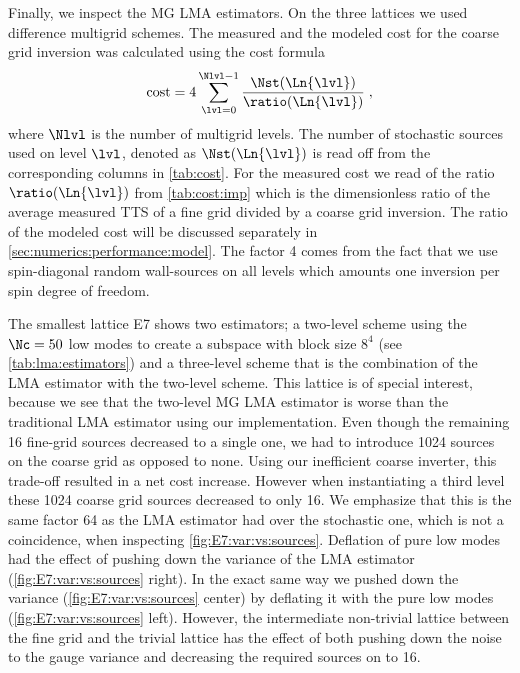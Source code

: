 Finally, we inspect the MG LMA estimators.
On the three lattices we used difference multigrid schemes.
The measured and the modeled cost for the coarse grid inversion was calculated using the cost formula
\begin{equation} \label{eq:numerics:cost}
\text{cost} = 4 \sum_{\lvl = 0}^{\Nlvl -1} \frac{\Nst(\Ln{\lvl})}{\ratio(\Ln{\lvl})} \;,
\end{equation}
where $\Nlvl$ is the number of multigrid levels.
The number of stochastic sources used on level $\lvl$, denoted as $\Nst(\Ln{\lvl})$ is read off from the corresponding columns in \cref{tab:cost}.
For the measured cost we read of the ratio $\ratio(\Ln{\lvl})$ from \cref{tab:cost:imp} which is the dimensionless ratio of the average measured TTS of a fine grid divided by a coarse grid inversion.
The ratio of the modeled cost will be discussed separately in \cref{sec:numerics:performance:model}.
The factor \num{4} comes from the fact that we use spin-diagonal random wall-sources on all levels which amounts one inversion per spin degree of freedom.

The smallest lattice E7 shows two estimators; a two-level scheme using the $\Nc=50$ low modes to create a subspace with block size $8^4$ (see \cref{tab:lma:estimators}) and a three-level scheme that is the combination of the LMA estimator with the two-level scheme.
This lattice is of special interest, because we see that the two-level MG LMA estimator is worse than the traditional LMA estimator using our implementation.
Even though the remaining \num{16} fine-grid sources decreased to a single one, we had to introduce \num{1024} sources on the coarse grid as opposed to none.
Using our inefficient coarse inverter, this trade-off resulted in a net cost increase.
However when instantiating a third level these \num{1024} coarse grid sources decreased to only \num{16}.
We emphasize that this is the same factor \num{64} as the LMA estimator had over the stochastic one, which is not a coincidence, when inspecting \cref{fig:E7:var:vs:sources}.
Deflation of pure low modes had the effect of pushing down the  variance of the LMA estimator (\cref{fig:E7:var:vs:sources} right).
In the exact same way we pushed down the  variance (\cref{fig:E7:var:vs:sources} center) by deflating it with the pure low modes (\cref{fig:E7:var:vs:sources} left).
However, the intermediate non-trivial lattice between the fine grid and the trivial lattice has the effect of both pushing down the  noise to the gauge variance and decreasing the required sources on  to \num{16}.

